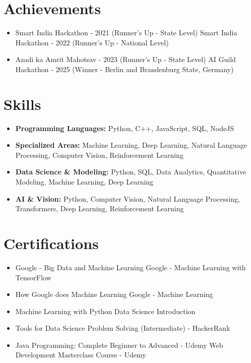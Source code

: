 \documentclass[a4paper,10pt]{article}
\begin{document}
\section*{Achievements}
\begin{itemize}
\item Smart India Hackathon - 2021 (Runner's Up - State Level) \hfill Smart India Hackathon - 2022 (Runner's Up - National Level)
\item Azadi ka Amrit Mahotsav - 2023 (Runner's Up - State Level) \hfill AI Guild Hackathon - 2025 (Winner - Berlin and Brandenburg State, Germany)
\end{itemize}

\section*{Skills}
\begin{itemize}
  \item \textbf{Programming Languages:} Python, C++, JavaScript, SQL, NodeJS
  \item \textbf{Specialized Areas:} Machine Learning, Deep Learning, Natural Language Processing, Computer Vision, Reinforcement Learning
  \item \textbf{Data Science \& Modeling:} Python, SQL, Data Analytics, Quantitative Modeling, Machine Learning, Deep Learning
  \item \textbf{AI \& Vision:} Python, Computer Vision, Natural Language Processing, Transformers, Deep Learning, Reinforcement Learning
\end{itemize}

\section*{Certifications}
\begin{itemize}
\item Google - Big Data and Machine Learning \hfill Google - Machine Learning with TensorFlow
\item How Google does Machine Learning \hfill Google - Machine Learning
\item Machine Learning with Python \hfill Data Science Introduction
\item Tools for Data Science \hfill Problem Solving (Intermediate) - HackerRank
\item Java Programming: Complete Beginner to Advanced - Udemy \hfill Web Development Masterclass Course - Udemy
\end{itemize}
\end{document}
